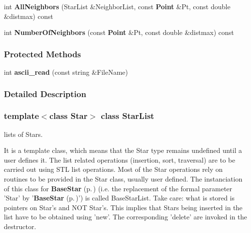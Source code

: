 \begin{CompactItemize}
\item 
{}
int {\bf All\-Neighbors} (Star\-List \&Neighbor\-List, const {\bf Point} \&Pt, const double \&distmax) const\label{class_starlist_a24}

\item 
{}
int {\bf Number\-Of\-Neighbors} (const {\bf Point} \&Pt, const double \&distmax) const\label{class_starlist_a25}

\end{CompactItemize}
\subsubsection*{Protected Methods}
\begin{CompactItemize}
\item 
{}
int {\bf ascii\_\-read} (const string \&File\-Name)\label{class_starlist_b0}

\end{CompactItemize}


\subsubsection{Detailed Description}
\subsubsection*{template$<$class Star$>$  class Star\-List}

lists of Stars.

It is a template class, which means that the Star type remains undefined until a user defines it.  The list related operations (insertion, sort, traversal) are to be carried out using STL  list operations. Most of the Star operations rely on routines to be provided in  the Star class, usually user defined. The instanciation of this class for  {\bf Base\-Star} {\rm (p.\,\pageref{class_basestar})} (i.e. the replacement  of the formal parameter 'Star' by '{\bf Base\-Star} {\rm (p.\,\pageref{class_basestar})}') is  called Base\-Star\-List.  Take care: what is stored is pointers on Star's and  NOT Star's. This implies that Stars being inserted in the list have to be  obtained using 'new'. The corresponding 'delete' are invoked in the destructor. 



